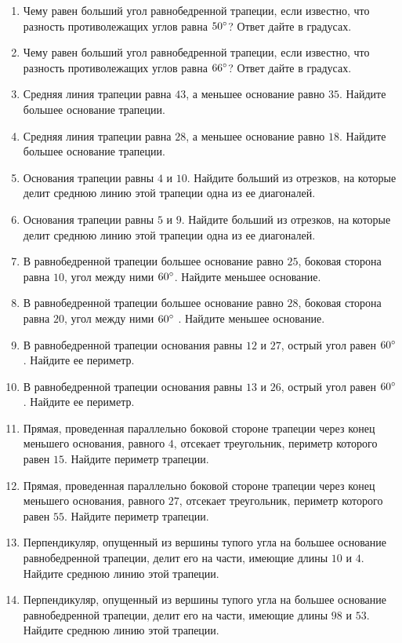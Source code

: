 \documentclass[12pt, a4paper]{article}
\begin{document}
\begin{enumerate}
		\item Чему равен больший угол равнобедренной трапеции, если известно, что разность противолежащих углов равна \( 50\degree\)? Ответ дайте в градусах.
		\item Чему равен больший угол равнобедренной трапеции, если известно, что разность противолежащих углов равна \( 66\degree \)? Ответ дайте в градусах.
		\item Средняя линия трапеции равна \( 43 \), а меньшее основание равно \( 35 \). Найдите большее основание трапеции.
		\item Средняя линия трапеции равна \( 28 \), а меньшее основание равно \( 18 \). Найдите большее основание трапеции.
		\item Основания трапеции равны \( 4  \) и \( 10 \). Найдите больший из отрезков, на которые делит среднюю линию этой трапеции одна из ее диагоналей.
		\item Основания трапеции равны \( 5  \) и \( 9 \). Найдите больший из отрезков, на которые делит среднюю линию этой трапеции одна из ее диагоналей.
		\item В равнобедренной трапеции большее основание равно \( 25 \), боковая сторона равна \( 10 \), угол между ними \( 60\degree  \). Найдите меньшее основание.
		\item В равнобедренной трапеции большее основание равно \( 28 \), боковая сторона равна \( 20 \), угол между ними \( 60 \degree\) . Найдите меньшее основание.
		\item В равнобедренной трапеции основания равны \( 12  \) и \( 27 \), острый угол равен \( 60 \degree\). Найдите ее периметр.
		\item В равнобедренной трапеции основания равны \( 13  \) и \( 26 \), острый угол равен \( 60\degree  \). Найдите ее периметр.
		\item Прямая, проведенная параллельно боковой стороне трапеции через конец меньшего основания, равного \( 4 \), отсекает треугольник, периметр которого равен \( 15 \). Найдите периметр трапеции.
		\item Прямая, проведенная параллельно боковой стороне трапеции через конец меньшего основания, равного \( 27 \), отсекает треугольник, периметр которого равен \( 55 \). Найдите периметр трапеции.
		\item Перпендикуляр, опущенный из вершины тупого угла на большее основание равнобедренной трапеции, делит его на части, имеющие длины \( 10  \) и \( 4 \). Найдите среднюю линию этой трапеции.
		\item Перпендикуляр, опущенный из вершины тупого угла на большее основание равнобедренной трапеции, делит его на части, имеющие длины \( 98  \) и \( 53 \). Найдите среднюю линию этой трапеции.

\end{enumerate}
\end{document}
